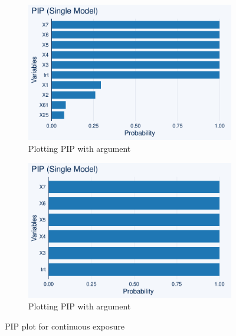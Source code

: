 \begin{figure}[htbp]
\begin{subfigure}{0.5\textwidth}
\includegraphics[width=\linewidth]{fig/conti_PIP_top_n.pdf}
\caption{Plotting PIP with  argument}
\end{subfigure}%
\begin{subfigure}{0.5\textwidth}
\includegraphics[width=\linewidth]{fig/conti_PIP_threshold.pdf}
\caption{Plotting PIP with  argument}
\end{subfigure}
\caption{PIP plot for continuous exposure}\label{fig:conti_pip}
\end{figure}

